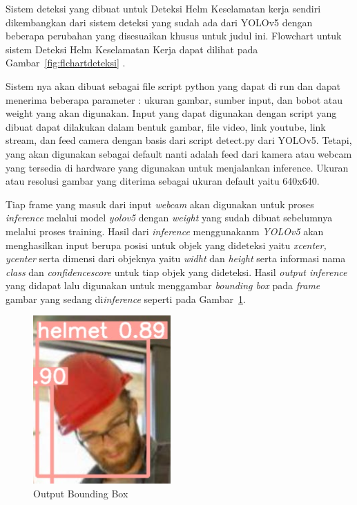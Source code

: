 Sistem deteksi yang dibuat untuk Deteksi Helm Keselamatan kerja sendiri dikembangkan dari sistem deteksi yang sudah ada dari YOLOv5 dengan beberapa perubahan yang disesuaikan khusus untuk judul ini. Flowchart untuk sistem Deteksi Helm Keselamatan Kerja dapat dilihat pada Gambar~\ref{fig:flchartdeteksi} .


Sistem nya akan dibuat sebagai file script python yang dapat di run dan dapat menerima beberapa parameter : ukuran gambar, sumber input, dan bobot atau weight yang akan digunakan. 
Input yang dapat digunakan dengan script yang dibuat dapat dilakukan dalam bentuk gambar, file video, link youtube, link stream, dan feed camera dengan basis dari script detect.py dari YOLOv5. Tetapi, yang akan digunakan sebagai default nanti adalah feed dari kamera atau webcam yang tersedia di hardware yang digunakan untuk menjalankan inference. Ukuran atau resolusi gambar yang diterima sebagai ukuran default yaitu 640x640. 


\par Tiap frame yang masuk dari input \emph{webcam} akan digunakan untuk proses \emph{inference} melalui 
model \emph{yolov5} dengan \emph{weight} yang sudah dibuat sebelumnya melalui proses training. 
Hasil dari \emph{inference} menggunakanm \emph{YOLOv5} akan menghasilkan input berupa posisi untuk 
objek yang dideteksi yaitu \emph{xcenter, ycenter} serta dimensi dari objeknya yaitu \emph{widht} 
dan \emph{height} serta informasi nama \emph{class} dan \emph{confidence\textunderscore score} untuk 
tiap objek yang dideteksi. Hasil \emph{output inference} yang didapat lalu digunakan untuk menggambar 
\emph{bounding box} pada \emph{frame} gambar yang sedang di\emph{inference} 
seperti pada Gambar~\ref{fig:outputboundingbox}.

\begin{figure}[ht]
  \centering
  \includegraphics[scale=1]{gambar/bounding_box.png}
  \caption{Output Bounding Box}
  \label{fig:outputboundingbox}
\end{figure}

